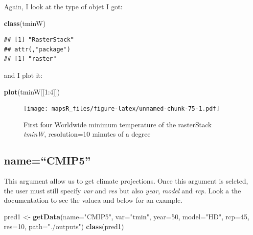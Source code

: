 \documentclass[]{report}
\newenvironment{Shaded}{\begin{snugshade}}{\end{snugshade}}
\newcommand{\KeywordTok}[1]{\textcolor[rgb]{0.13,0.29,0.53}{\textbf{{#1}}}}
\newcommand{\DataTypeTok}[1]{\textcolor[rgb]{0.13,0.29,0.53}{{#1}}}
\newcommand{\DecValTok}[1]{\textcolor[rgb]{0.00,0.00,0.81}{{#1}}}
\newcommand{\StringTok}[1]{\textcolor[rgb]{0.31,0.60,0.02}{{#1}}}
\newcommand{\NormalTok}[1]{{#1}}
\begin{document}
Again, I look at the type of objet I got:

\begin{Shaded}
\begin{Highlighting}[]
\KeywordTok{class}\NormalTok{(tminW)}
\end{Highlighting}
\end{Shaded}

\begin{verbatim}
## [1] "RasterStack"
## attr(,"package")
## [1] "raster"
\end{verbatim}

and I plot it:

\begin{Shaded}
\begin{Highlighting}[]
\KeywordTok{plot}\NormalTok{(tminW[[}\DecValTok{1}\NormalTok{:}\DecValTok{4}\NormalTok{]])}
\end{Highlighting}
\end{Shaded}

\begin{figure}[htbp]
\centering
\texttt{[image: mapsR\_files/figure-latex/unnamed-chunk-75-1.pdf]}
\caption{First four Worldwide minimum temperature of the rasterStack
\emph{tminW}, resolution=10 minutes of a degree}
\end{figure}

\subsection{\texorpdfstring{name=``CMIP5''}{name=CMIP5}}\label{namecmip5}

This argument allow us to get climate projections. Once this argument is
selcted, the user must still specify \emph{var} and \emph{res} but also
\emph{year}, \emph{model} and \emph{rcp}. Look a the documentation to
see the valuea and below for an example.

\begin{Shaded}
\begin{Highlighting}[]
\NormalTok{pred1 <-}\StringTok{ }\KeywordTok{getData}\NormalTok{(}\DataTypeTok{name=}\StringTok{"CMIP5"}\NormalTok{, }\DataTypeTok{var=}\StringTok{"tmin"}\NormalTok{, }\DataTypeTok{year=}\DecValTok{50}\NormalTok{, }\DataTypeTok{model=}\StringTok{"HD"}\NormalTok{, }\DataTypeTok{rcp=}\DecValTok{45}\NormalTok{, }\DataTypeTok{res=}\DecValTok{10}\NormalTok{, }\DataTypeTok{path=}\StringTok{"./outputs"}\NormalTok{)}
\KeywordTok{class}\NormalTok{(pred1)}
\end{Highlighting}
\end{Shaded}
\end{document}
